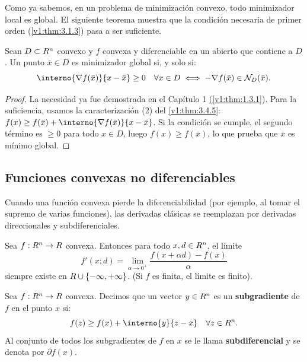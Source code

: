 Como ya sabemos, en un problema de minimización convexo, todo minimizador local es global. El siguiente teorema muestra que la condición necesaria de primer orden (\cref{v1:thm:3.1.3}) pasa a ser suficiente.

\begin{theorem}\label{v1:thm:3.4.6}
 Sean $D \subset R^n$ convexo y $f$ convexa y diferenciable en un abierto que contiene a $D$. Un punto $\bar{x} \in D$ es minimizador global si, y solo si:
 \[
 \interno{\nabla f(\bar{x})}{x - \bar{x}} \ge 0 \quad \forall x \in D \iff -\nabla f(\bar{x}) \in \mathcal{N}_D(\bar{x}).
 \]
\end{theorem}

\begin{proof}
 La necesidad ya fue demostrada en el Capítulo 1 (\cref{v1:thm:1.3.1}). Para la suficiencia, usamos la caracterización (2) del \cref{v1:thm:3.4.5}: $f(x) \ge f(\bar{x}) + \interno{\nabla f(\bar{x})}{x - \bar{x}}$. Si la condición se cumple, el segundo término es $\ge 0$ para todo $x \in D$, luego $f(x) \ge f(\bar{x})$, lo que prueba que $\bar{x}$ es mínimo global.
\end{proof}

\subsection{Funciones convexas no diferenciables}

Cuando una función convexa pierde la diferenciabilidad (por ejemplo, al tomar el supremo de varias funciones), las derivadas clásicas se reemplazan por derivadas direccionales y subdiferenciales.

\begin{theorem}\label{v1:thm:3.4.7}
 Sea $f : R^n \to R$ convexa. Entonces para todo $x, d \in R^n$, el límite
 \[
 f'(x; d) = \lim_{\alpha \to 0^+} \frac{f(x + \alpha d) - f(x)}{\alpha}
 \]
 siempre existe en $R \cup \{-\infty, +\infty\}$. (Si $f$ es finita, el límite es finito).
\end{theorem}

\begin{definition}\label{v1:def:3.4.1}
 Sea $f : R^n \to R$ convexa. Decimos que un vector $y \in R^n$ es un \textbf{subgradiente} de $f$ en el punto $x$ si:
 \begin{equation}
 f(z) \ge f(x) + \interno{y}{z-x} \quad \forall z \in \Rn. \label{v1:eq:3.14}
 \end{equation}
 Al conjunto de todos los subgradientes de $f$ en $x$ se le llama \textbf{subdiferencial} y se denota por $\partial f(x)$.
\end{definition}


